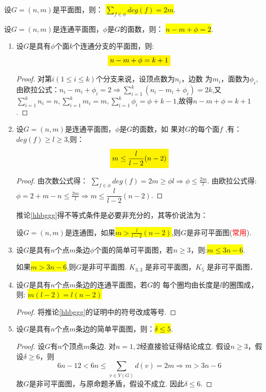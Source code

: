 \begin{theorem}[次数公式]
	设$G=(n, m)$是平面图，则：
	\colorbox{yellow}{$\sum\limits_{f \in \phi} deg(f) = 2m$}.
\end{theorem}
\begin{theorem}[欧拉公式]
	\label{oula}
	设$G=(n, m)$是连通平面图，$\phi$是$G$的面数，则：
	\colorbox{yellow}{$n-m+\phi =2$}.
\end{theorem}
\begin{corollary}
	\label{tuilun}
	\begin{enumerate}
		\item 设$G$是具有$\phi $个面$k$个连通分支的平面图，则:
		\[
		\colorbox{yellow}{$n-m+\phi =k+1$}
		\]
		\begin{proof}
			对第$i (1\leq i\leq k  )$个分支来说，设顶点数为$n_i$，边数
			为$m_i$，面数为$\phi_i$,由欧拉公式：$n_i-m_i+\phi_i =2 \Rightarrow \sum\limits_{i=1}^k(n_i-m_i+\phi_i)=2k$,又$\sum\limits_{i=1}^kn_i=n,\sum\limits_{i=1}^km_i=m, \sum\limits_{i=1}^k\phi_i=\phi+k-1$,故得$n-m+\phi =k+1$.
		\end{proof}
		\item \label{hhbggg}设$G=(n, m)$是连通平面图，$\phi$是$G$的面数，如
		果对$G$的每个面$f$ ,有：$deg (f) \geq l \geq 3$,则：
			\[
		\colorbox{yellow}{$m\leq \dfrac{l}{l-2}(n-2)$}
		\]
		\begin{proof}
			由次数公式得：
			$\sum\limits_{f \in \phi} deg(f) = 2m\geq \phi l\Rightarrow \phi \leq \frac{2m}{l}$. 由欧拉公式得:$\phi = 2+m-n\leq \frac{2m}{l} \Rightarrow m\leq \dfrac{l}{l-2}(n-2)$.
		\end{proof}
		\begin{note}
			推论\ref{hhbggg}得不等式条件是必要非充分的，其等价说法为：
			
			设$G=(n, m)$是连通图，如果\colorbox{yellow}{$m> \frac{l}{l-2}(n-2)$},则$G$是非可平面图(\textcolor{red}{常用}).
		\end{note}
		\item \label{hhhhhkkgga}设$G$是具有$n$个点$m$条边$\phi$个面的简单可平面图，若$n\geq 3$，则:\colorbox{yellow}{$m\leq 3n-6$}.
			\begin{note}
		如果\colorbox{yellow}{$m> 3n-6$},则$G$是非可平面图. $K_{3,3}$ 是非可平面图，$K_5$ 是非可平面图．
		\end{note}
		\item 设$G$是具有$n$个点$m$条边的连通平面图，若$G$的
		每个圈均由长度是$l$的圈围成，则:
		\colorbox{yellow}{$m(l-2)=l(n-2)$}
		\begin{proof}
	将推论\ref{hhbggg}的证明中的符号改成等号.
		\end{proof}
	\item 设$G$是具有$n$个点$m$条边的简单平面图，则：\colorbox{yellow}{$\delta \leq 5$}.
	\begin{proof}
		设$G$有$n$个顶点$m$条边. 对$n=1,2$经直接验证得结论成立. 假设$n\geq 3$，假设$\delta \geq 6$，则
		\[
		6n-12<6n \leq \sum\limits_{v\in V(G)}d(v) =2m \Rightarrow m> 3n-6
		\]故$G$是非可平面图，与原命题矛盾，假设不成立. 因此$\delta \leq 6$.
	\end{proof}

\end{enumerate}
\end{corollary}


